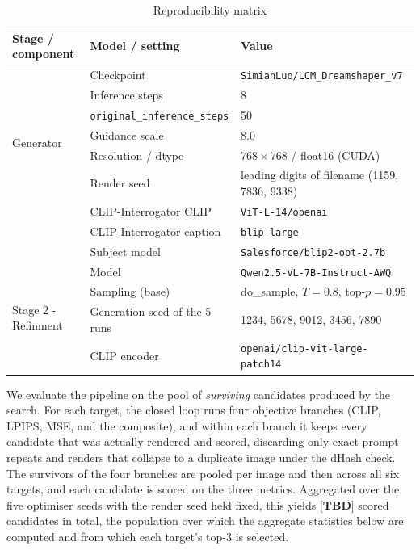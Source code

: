 \documentclass[runningheads]{llncs}
\newcommand{\NCAND}{\textbf{[TBD]}}
\begin{document}
\begin{table}[H]
\centering
\caption{Reproducibility matrix}
\label{tab:repro}
\small
\begin{tabular}{p{3.1cm} p{5.0cm} p{4.9cm}}
\toprule
\textbf{Stage / component} & \textbf{Model / setting} & \textbf{Value} \\
\midrule
\multirow{7}{*}{Generator}
 & Checkpoint & \texttt{SimianLuo/LCM\_Dreamshaper\_v7} \\
 & Inference steps & 8 \\
 & \texttt{original\_inference\_steps} & 50 \\
 & Guidance scale & 8.0 \\
 & Resolution / dtype & $768\times768$ / float16 (CUDA) \\
 & Render seed & leading digits of filename (1159, 7836, 9338) \\
\midrule
\multirow{3}{*}{Stage 1}
 & CLIP-Interrogator CLIP & \texttt{ViT-L-14/openai} \\
 & CLIP-Interrogator caption & \texttt{blip-large} \\
 & Subject model & \texttt{Salesforce/blip2-opt-2.7b} \\
\midrule
\multirow{5}{*}{Stage 2 - Refinment}
 & Model & \texttt{Qwen2.5-VL-7B-Instruct-AWQ} \\
 & Sampling (base) & do\_sample, $T=0.8$, top-$p=0.95$ \\
 & Generation seed of the 5 runs & {1234, 5678, 9012, 3456, 7890}\\
\midrule
Evaluation
 & CLIP encoder & \texttt{openai/clip-vit-large-patch14} \\
\bottomrule
\end{tabular}
\end{table}

\noindent
We evaluate the pipeline on the pool of \emph{surviving} candidates produced by the search. For each target, the closed loop runs four objective branches (CLIP, LPIPS, MSE, and the composite), and within each branch it keeps every candidate that was actually rendered and scored, discarding only exact prompt repeats and renders that collapse to a duplicate image under the dHash check. The survivors of the four branches are pooled per image and then across all six targets, and each candidate is scored on the three metrics. Aggregated over the five optimiser seeds with the render seed held fixed, this yields $\NCAND$ scored candidates in total, the population over which the aggregate statistics below are computed and from which each target's top-3 is selected.
\end{document}
